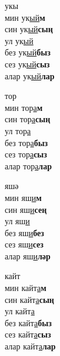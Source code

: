 \begin{multicols}{4}
\begin{enumerate}
\begin{minipage}{\linewidth}
    \item
    укы\\
    мин ук\underline{ый}\textbf{м}\\
    син ук\underline{ый}\textbf{сың}\\
    ул ук\underline{ый}\\
    без ук\underline{ый}\textbf{быз}\\
    сез ук\underline{ый}\textbf{сыз}\\
    алар ук\underline{ый}\textbf{лар}\\
\end{minipage}

\begin{minipage}{\linewidth}
    \item
    тор\\
    мин тор\underline{а}\textbf{м}\\
    син тор\underline{а}\textbf{сың}\\
    ул тор\underline{а}\\
    без тор\underline{а}\textbf{быз}\\
    сез тор\underline{а}\textbf{сыз}\\
    алар тор\underline{а}\textbf{лар}\\
\end{minipage}

\begin{minipage}{\linewidth}
    \item
    яшә\\
    мин яш\underline{и}\textbf{м}\\
    син яш\underline{и}\textbf{сең}\\
    ул яш\underline{и}\\
    без яш\underline{и}\textbf{без}\\
    сез яш\underline{и}\textbf{сез}\\
    алар яш\underline{и}\textbf{ләр}\\
\end{minipage}

\begin{minipage}{\linewidth}
    \item
    кайт\\
    мин кайт\underline{а}\textbf{м}\\
    син кайт\underline{а}\textbf{сың}\\
    ул кайт\underline{а}\\
    без кайт\underline{а}\textbf{быз}\\
    сез кайт\underline{а}\textbf{сыз}\\
    алар кайт\underline{а}\textbf{лар}\\
\end{minipage}


\end{enumerate}
\end{multicols}
